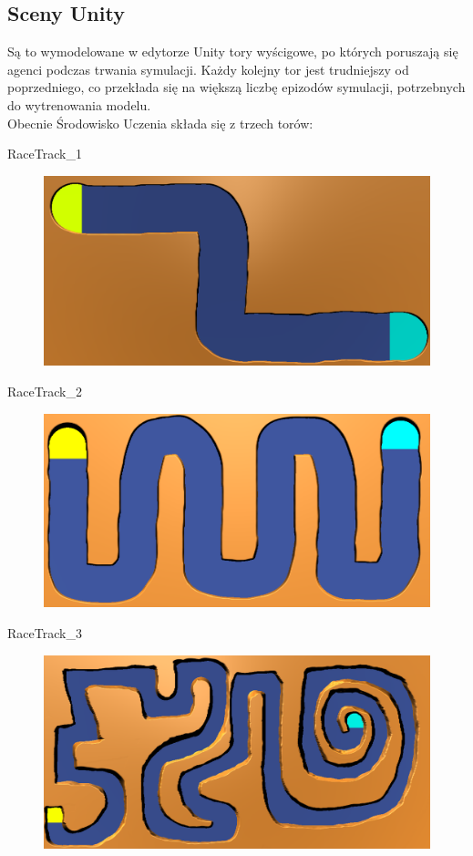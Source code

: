 \subsection{Sceny Unity}
\label{UnityScenes}
Są to wymodelowane w edytorze Unity tory wyścigowe, po których poruszają się agenci podczas trwania symulacji. 
Każdy kolejny tor jest trudniejszy od poprzedniego, co przekłada się na większą liczbę epizodów symulacji, potrzebnych do wytrenowania modelu. \\
Obecnie Środowisko Uczenia składa się z trzech torów:
\newpage
\begin{enumerate*}
\item RaceTrack\_1
\begin{figure}[H]
\centering
\includegraphics[width=13cm]{resources/figures/track_1.png}
\end{figure}
\item RaceTrack\_2
\begin{figure}[H]
\centering
\includegraphics[width=13cm]{resources/figures/track_2.png}
\end{figure}
\item RaceTrack\_3
\begin{figure}[H]
\centering
\includegraphics[width=13cm]{resources/figures/track_3.png}
\end{figure}
\end{enumerate*}

